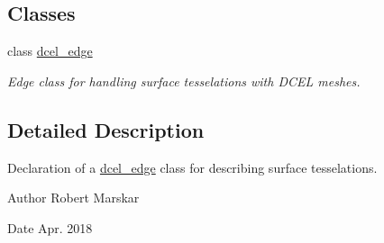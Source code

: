 \subsection*{Classes}
\begin{DoxyCompactItemize}
\item 
class \hyperlink{classdcel__edge}{dcel\+\_\+edge}
\begin{DoxyCompactList}\small\item\em Edge class for handling surface tesselations with D\+C\+EL meshes. \end{DoxyCompactList}\end{DoxyCompactItemize}


\subsection{Detailed Description}
Declaration of a \hyperlink{classdcel__edge}{dcel\+\_\+edge} class for describing surface tesselations. 

\begin{DoxyAuthor}{Author}
Robert Marskar 
\end{DoxyAuthor}
\begin{DoxyDate}{Date}
Apr. 2018 
\end{DoxyDate}

